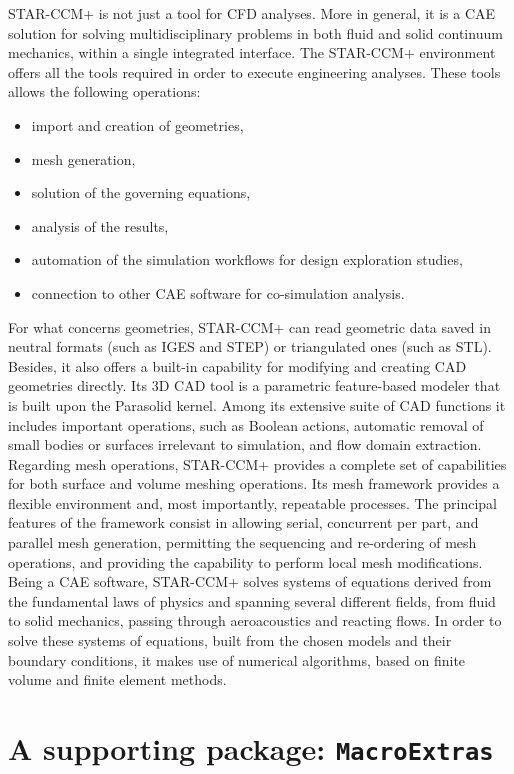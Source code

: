 STAR-CCM+ is not just a tool for \gls{CFD} analyses. More in general, it is a \gls{CAE} solution for solving multidisciplinary problems in both fluid and solid continuum mechanics, within a single integrated interface. The STAR-CCM+ environment offers all the tools required in order to execute engineering analyses. These tools allows the following operations:
%
\begin{itemize}
\item import and creation of geometries,
\item mesh generation,
\item solution of the governing equations,
\item analysis of the results,
\item automation of the simulation workflows for design exploration studies,
\item connection to other \gls{CAE} software for co-simulation analysis.
\end{itemize}
%
For what concerns geometries, STAR-CCM+ can read geometric data saved in neutral formats (such as IGES and STEP) or triangulated ones (such as STL). Besides, it also offers a built-in capability for modifying and creating \gls{CAD} geometries directly. Its 3D \gls{CAD} tool is a parametric feature-based modeler that is built upon the Parasolid kernel. Among its extensive suite of \gls{CAD} functions it includes important operations, such as Boolean actions, automatic removal of small bodies or surfaces irrelevant to simulation, and flow domain extraction. Regarding mesh operations, STAR-CCM+ provides a complete set of capabilities for both surface and volume meshing operations. Its mesh framework provides a flexible environment and, most importantly, repeatable processes. The principal features of the framework consist in allowing serial, concurrent per part, and parallel mesh generation, permitting the sequencing and re-ordering of mesh operations, and providing the capability to perform local mesh modifications. Being a \gls{CAE} software, STAR-CCM+ solves systems of equations derived from the fundamental laws of physics and spanning several different fields, from fluid to solid mechanics, passing through aeroacoustics and reacting flows. In order to solve these systems of equations, built from the chosen models and their boundary conditions, it makes use of numerical algorithms, based on finite volume and finite element methods. \cite{STARCCMUserGuide}

\section{A supporting package: \texttt{MacroExtras}}
\label{sec4.3}

